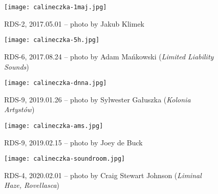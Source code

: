 \documentclass[a4paper]{article}
\begin{document}
\newpage


\begin{wrapfigure}{l}{0.997\textwidth}
  \centering
  \texttt{[image: calineczka-1maj.jpg]}
  \caption*{RDS-2, 2017.05.01 -- photo by Jakub Klimek}
\end{wrapfigure}
\vspace{4mm}
\begin{wrapfigure}{l}{0.997\textwidth}
  \centering
  \texttt{[image: calineczka-5h.jpg]}
  \caption*{RDS-6, 2017.08.24 -- photo by Adam Mańkowski (\emph{Limited Liability Sounds})}
\end{wrapfigure}


\begin{wrapfigure}{l}{0.997\textwidth}
  \centering
  \texttt{[image: calineczka-dnna.jpg]}
  \caption*{RDS-9, 2019.01.26 -- photo by Sylwester Gałuszka (\emph{Kolonia Artystów})}
\end{wrapfigure}
\vspace{4mm}
\begin{wrapfigure}{l}{0.997\textwidth}
  \centering
  \texttt{[image: calineczka-ams.jpg]}
  \caption*{RDS-9, 2019.02.15 -- photo by Joey de Buck}
\end{wrapfigure}


\begin{wrapfigure}{l}{0.997\textwidth}
  \centering
  \texttt{[image: calineczka-soundroom.jpg]}
  \caption*{RDS-4, 2020.02.01 -- photo by Craig Stewart Johnson (\emph{Liminal Haze, Rovellasca})}
\end{wrapfigure}
\end{document}
